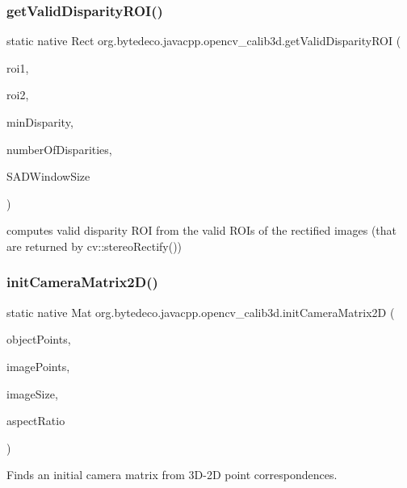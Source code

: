 \subsubsection{\texorpdfstring{get\+Valid\+Disparity\+R\+O\+I()}{getValidDisparityROI()}}
{\footnotesize\ttfamily static native Rect org.\+bytedeco.\+javacpp.\+opencv\+\_\+calib3d.\+get\+Valid\+Disparity\+R\+OI (\begin{DoxyParamCaption}\item[{@By\+Val Rect}]{roi1,  }\item[{@By\+Val Rect}]{roi2,  }\item[{int}]{min\+Disparity,  }\item[{int}]{number\+Of\+Disparities,  }\item[{int}]{S\+A\+D\+Window\+Size }\end{DoxyParamCaption})\hspace{0.3cm}{\ttfamily [static]}}

computes valid disparity R\+OI from the valid R\+O\+Is of the rectified images (that are returned by cv\+::stereo\+Rectify()) \mbox{\label{group__calib3d_ga783c80e734c8368c9db31e3ad820f7fa}} 
\subsubsection{\texorpdfstring{init\+Camera\+Matrix2\+D()}{initCameraMatrix2D()}}
{\footnotesize\ttfamily static native Mat org.\+bytedeco.\+javacpp.\+opencv\+\_\+calib3d.\+init\+Camera\+Matrix2D (\begin{DoxyParamCaption}\item[{@By\+Val Mat\+Vector}]{object\+Points,  }\item[{@By\+Val Mat\+Vector}]{image\+Points,  }\item[{@By\+Val Size}]{image\+Size,  }\item[{double}]{aspect\+Ratio }\end{DoxyParamCaption})\hspace{0.3cm}{\ttfamily [static]}}



Finds an initial camera matrix from 3\+D-\/2D point correspondences. 


